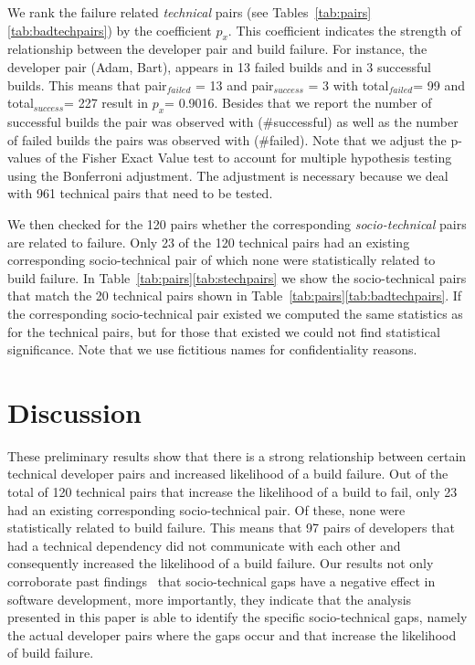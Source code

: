 \documentclass[conference]{IEEEtran}
\begin{document}
We rank the failure related \emph{technical} pairs (see Tables~\ref{tab:pairs}\ref{tab:badtechpairs})
by the coefficient $p_{x}$. This coefficient indicates the strength of
relationship between the developer pair and build failure. For instance, the
developer pair (Adam, Bart), appears in 13 failed builds and in 3
successful builds. This means that pair$_{failed}$ = 13 and pair$_{success}$ = 3
with total$_{failed}$= 99 and total$_{success}$= 227 result in $p_x$= 0.9016.
Besides that we report the number of successful builds the pair was observed with
(\#successful) as well as the number of failed builds the pairs was observed with
(\#failed). 
Note that we adjust the p-values of the Fisher Exact Value test to account for multiple hypothesis testing using the Bonferroni adjustment.
The adjustment is necessary because we deal with 961 technical pairs that need to be tested. 

We then checked for the 120 pairs whether the corresponding \emph{socio-technical} pairs are related to failure.
Only 23 of the 120 technical pairs had an existing corresponding socio-technical pair of which none were statistically related to build failure. 
In Table~\ref{tab:pairs}\ref{tab:stechpairs} we show the socio-technical pairs that match the 20 technical pairs shown in Table~\ref{tab:pairs}\ref{tab:badtechpairs}.
If the corresponding socio-technical pair existed we computed the same statistics as for the technical pairs, but for those that existed we could not find statistical significance.
Note that we use fictitious names for confidentiality reasons.


\section{Discussion}
These preliminary results show that there is a strong relationship between certain technical
developer pairs and increased likelihood of a build failure.
Out of the total of 120 technical pairs that increase the likelihood of a
build to fail, only 23 had an existing
corresponding socio-technical pair. Of these, none were statistically
related to build failure. This means that 97 pairs of developers that had a
technical dependency did not communicate with each other and
consequently increased the likelihood of a build failure. Our results not only
corroborate past findings~\cite{cataldo:cscw:2006,cataldo:esem:2008} that socio-technical gaps
have a negative effect in software development, more importantly, they indicate
that the analysis presented in this paper is able to identify the specific
socio-technical gaps, namely the actual developer pairs where the gaps occur
and that increase the likelihood of build failure. 
\end{document}
